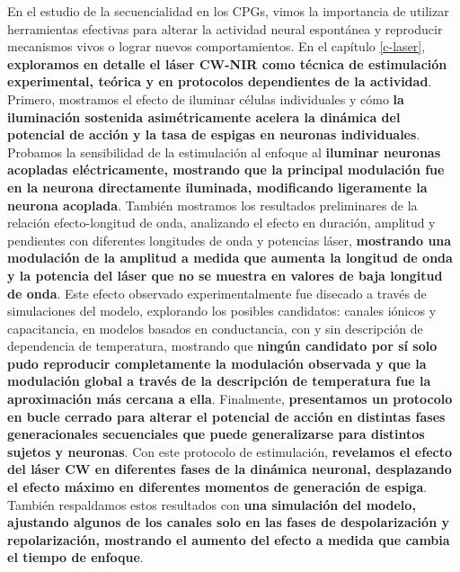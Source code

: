 En el estudio de la secuencialidad en los CPGs, vimos la importancia de utilizar herramientas efectivas para alterar la actividad neural espontánea y reproducir mecanismos vivos o lograr nuevos comportamientos. En el capítulo \ref{c-laser}, \textbf{exploramos en detalle el láser CW-NIR como técnica de estimulación experimental, teórica y en protocolos dependientes de la actividad}. Primero, mostramos el efecto de iluminar células individuales y cómo \textbf{la iluminación sostenida asimétricamente acelera la dinámica del potencial de acción y la tasa de espigas en neuronas individuales}. Probamos la sensibilidad de la estimulación al enfoque al \textbf{iluminar neuronas acopladas eléctricamente, mostrando que la principal modulación fue en la neurona directamente iluminada, modificando ligeramente la neurona acoplada}. También mostramos los resultados preliminares de la relación efecto-longitud de onda, analizando el efecto en duración, amplitud y pendientes con diferentes longitudes de onda y potencias láser, \textbf{mostrando una modulación de la amplitud a medida que aumenta la longitud de onda y la potencia del láser que no se muestra en valores de baja longitud de onda}. Este efecto observado experimentalmente fue disecado a través de simulaciones del modelo, explorando los posibles candidatos: canales iónicos y capacitancia, en modelos basados en conductancia, con y sin descripción de dependencia de temperatura, mostrando que \textbf{ningún candidato por sí solo pudo reproducir completamente la modulación observada y que la modulación global a través de la descripción de temperatura fue la aproximación más cercana a ella}. Finalmente, \textbf{presentamos un protocolo en bucle cerrado para alterar el potencial de acción en distintas fases generacionales secuenciales que puede generalizarse para distintos sujetos y neuronas}. Con este protocolo de estimulación, \textbf{revelamos el efecto del láser CW en diferentes fases de la dinámica neuronal, desplazando el efecto máximo en diferentes momentos de generación de espiga}. También respaldamos estos resultados con \textbf{una simulación del modelo, ajustando algunos de los canales solo en las fases de despolarización y repolarización, mostrando el aumento del efecto a medida que cambia el tiempo de enfoque}.

